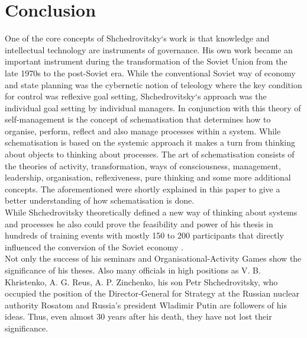 \documentclass[11pt,a4paper]{article}
\begin{document}
\section{Conclusion}
One of the core concepts of Shchedrovitsky‘s work is that knowledge and intellectual technology are instruments of governance. His own work became an important instrument during the transformation of the Soviet Union from the late 1970s to the post-Soviet era. While the conventional Soviet way of economy and state planning was the cybernetic notion of teleology where the key condition for control was reflexive goal setting, Shchedrovitsky‘s approach was the individual goal setting by individual managers. In conjunction with this theory of self-management is the concept of schematisation that determines how to organise, perform, reflect and also manage processes within a system. While schematisation is based on the systemic approach it makes a turn from thinking about objects to thinking about processes. The art of schematisation consists of the theories of activity, transformation, ways of consciousness, management, leadership, organisation, reflexiveness, pure thinking and some more additional concepts. The aforementioned were shortly explained in this paper to give a better understanding of how schematisation is done. \\
While Shchedrovitsky theoretically defined a new way of thinking about systems and processes he also could prove the feasibility and power of his thesis in hundreds of training events with mostly 150 to 200 participants that directly influenced the conversion of the Soviet economy \cite[p. 3]{Rindzeviit2015}. \\
Not only the success of his seminars and Organisational-Activity Games show the significance of his theses. Also many officials in high positions as V. B. Khristenko, A. G. Reus, A. P. Zinchenko, his son Petr Shchedrovitsky, who occupied the position of the Director‑General for Strategy at the Russian nuclear authority Rosatom and Russia's president Wladimir Putin are followers of his ideas. Thus, even almost 30 years after his death, they have not lost their significance. 

\newpage

\end{document}
